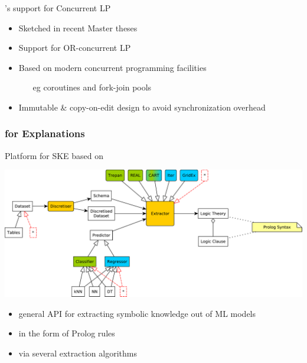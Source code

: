 \documentclass[presentation]{beamer}\mode<presentation>{\usetheme{AMSBolognaFC}}
\begin{document}
\begin{frame}{\twopkt{}'s support for Concurrent LP}
    \begin{itemize}

        \item Sketched in recent Master theses

        \vfill

        \item Support for OR-concurrent LP
        
        \vfill

        \item Based on modern concurrent programming facilities 
        \begin{itemize}
            \item[eg] coroutines and fork-join pools
        \end{itemize}

        \vfill

        \item Immutable \& copy-on-edit design to avoid synchronization overhead
    \end{itemize}
\end{frame}

\subsubsection{\twopkt{} for Explanations}

\begin{frame}{Platform for SKE based on \twopkt{}}
    \begin{center}
        \includegraphics[width=.8\linewidth]{figures/Psyke.pdf}
    \end{center}
    \vfill
    \begin{itemize}
        \item general API for extracting symbolic knowledge out of ML models
        \vfill
        \item in the form of Prolog rules
        \vfill
        \item via several extraction algorithms
    \end{itemize}
\end{frame}
\end{document}
